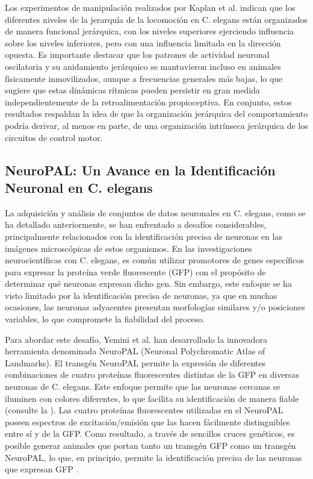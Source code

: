 Los experimentos de manipulación realizados por Kaplan et al.  indican que los diferentes niveles de la jerarquía de la locomoción en C. elegans están organizados de manera funcional jerárquica, con los niveles superiores ejerciendo influencia sobre los niveles inferiores, pero con una influencia limitada en la dirección opuesta. Es importante destacar que los patrones de actividad neuronal oscilatoria y su anidamiento jerárquico se mantuvieron incluso en animales físicamente inmovilizados, aunque a frecuencias generales más bajas, lo que sugiere que estas dinámicas rítmicas pueden persistir en gran medida independientemente de la retroalimentación propioceptiva. En conjunto, estos resultados respaldan la idea de que la organización jerárquica del comportamiento podría derivar, al menos en parte, de una organización intrínseca jerárquica de los circuitos de control motor.


\subsection{NeuroPAL: Un Avance en la Identificación Neuronal en C. elegans}


La adquisición y análisis de conjuntos de datos neuronales en C. elegans, como se ha detallado anteriormente, se han enfrentado a desafíos considerables, principalmente relacionados con la identificación precisa de neuronas en las imágenes microscópicas de estos organismos. En las investigaciones neurocientíficas con C. elegans, es común utilizar promotores de genes específicos para expresar la proteína verde fluorescente (GFP) con el propósito de determinar qué neuronas expresan dicho gen. Sin embargo, este enfoque se ha visto limitado por la identificación precisa de neuronas, ya que en muchas ocasiones, las neuronas adyacentes presentan morfologías similares y/o posiciones variables, lo que compromete la fiabilidad del proceso.

Para abordar este desafío, Yemini et al. \cite{yemini_neuropal_2021} han desarrollado la innovadora herramienta denominada \gls{NeuroPAL} (Neuronal Polychromatic Atlas of Landmarks).    El transgén NeuroPAL permite la expresión de diferentes combinaciones de cuatro proteínas fluorescentes distintas de la GFP en diversas neuronas de C. elegans. Este enfoque permite que las neuronas cercanas se iluminen con colores diferentes, lo que facilita su identificación de manera fiable (consulte la ). Las cuatro proteínas fluorescentes utilizadas en el NeuroPAL poseen espectros de excitación/emisión que las hacen fácilmente distinguibles entre sí y de la GFP. Como resultado, a través de sencillos cruces genéticos, es posible generar animales que portan tanto un transgén GFP como un transgén NeuroPAL, lo que, en principio, permite la identificación precisa de las neuronas que expresan GFP \cite{santiago_using_2022}.
 
